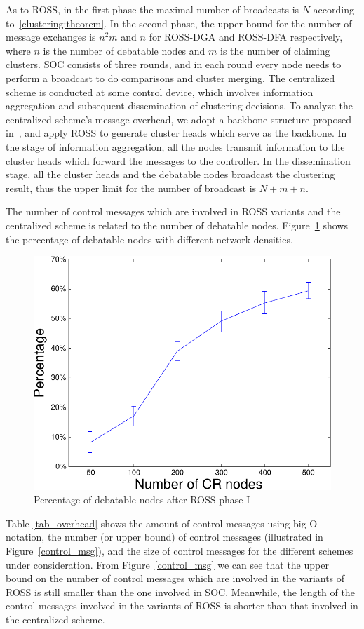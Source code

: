 \documentclass[times]{ettauth}
\theoremstyle{mytheoremstyle}
\theoremstyle{mytheoremstyle}
\theoremstyle{mytheoremstyle}
\begin{document}
As to ROSS, in the first phase the maximal number of broadcasts is $N$ according to~\ref{clustering:theorem}.
In the second phase, the upper bound for the number of message exchanges is $n^2m$ and $n$ for ROSS-DGA and ROSS-DFA respectively, where $n$ is the number of debatable nodes and $m$ is the number of claiming clusters.
SOC consists of three rounds, and in each round every node needs to perform a broadcast to do comparisons and cluster merging.
The centralized scheme is conducted at some control device, which involves information aggregation and subsequent dissemination of clustering decisions.
To analyze the centralized scheme's message overhead, we adopt a backbone structure proposed in~\cite{Efficient_broadcasting_gathering_adhoc}, and apply ROSS to generate cluster heads which serve as the backbone.
In the stage of information aggregation, all the nodes transmit information to the cluster heads which forward the messages to the controller. 
In the dissemination stage, all the cluster heads and the debatable nodes broadcast the clustering result, thus the upper limit for the number of broadcast is $N+m+n$.

The number of control messages which are involved in ROSS variants and the centralized scheme is related to the number of debatable nodes.
Figure~\ref{percentage_overlapping_node} shows the percentage of debatable nodes with different network densities.
\begin{figure}[ht!]
  \centering
  \includegraphics[width=0.6\linewidth]{percentage_overlapping_node.pdf}
  \caption{Percentage of debatable nodes after ROSS phase I}
  \label{percentage_overlapping_node}
\end{figure}
%
Table \ref{tab_overhead} shows the amount of control messages using big O notation, the number (or upper bound) of control messages (illustrated in Figure~\ref{control_msg}), and the size of control messages for the different schemes under consideration.
From Figure~\ref{control_msg} we can see that the upper bound on the number of control messages which are involved in the variants of ROSS is still smaller than the one involved in SOC.
Meanwhile, the length of the control messages involved in the variants of ROSS is shorter than that involved in the centralized scheme.
\end{document}
